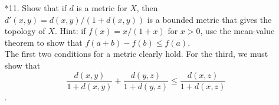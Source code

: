 \documentclass[12pt,letterpaper]{article}
\begin{document}
\begin{enumerate}
\begin{enumerate}
  \end{enumerate}
  \item [*11.] Show that if $d$ is a metric for $X$, then $d'(x,y) = d(x,y)/(1+d(x,y))$ is a bounded metric that gives the topology of $X$. Hint: if $f(x) = x/(1+x)$ for $x>0$, use the mean-value theorem to show that $f(a+b)-f(b)\leq f(a)$. \\
  The first two conditions for a metric clearly hold. For the third, we must show that $$\frac{d(x,y)}{1+d(x,y)} + \frac{d(y,z)}{1+d(y,z)} \leq \frac{d(x,z)}{1+d(x,z)}$$.
\end{enumerate}
\end{document}
